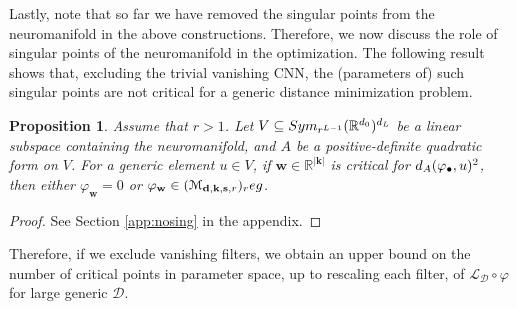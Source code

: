 \documentclass[twoside]{article}
\theoremstyle{plain}%
\newtheorem{prop}[thm]{Proposition}
\theoremstyle{definition}
\theoremstyle{remark}
\newcommand{\symm}[2]{\textnormal{Sym}_{#1}(\mathbb{R}^{#2})}
\newcommand{\edd}{\textnormal{gED}}
\newcommand{\vs}[1]{\textcolor{blue}{{#1}}}
\begin{document}
Lastly, note that so far we have removed the singular points from the neuromanifold in the above constructions. Therefore, we now discuss the role of singular points of the neuromanifold in the optimization. The following result shows that, excluding the trivial vanishing CNN, the (parameters of) such singular points are not critical for a generic distance minimization problem. 

\begin{prop}\label{prop:nosing}
Assume that $r>1$. Let $V \subseteq \symm{r^{L-1}}{d_0}^{d_L}$ be a linear subspace containing the neuromanifold, and $A$ be a positive-definite quadratic form on $V$. For a generic element $u \in V$, if $\mathbf{w}  \in \mathbb{R}^{|\mathbf{k}|}$ is critical for $\textnormal{d}_A(\varphi_{\bullet}, u)^2$, then either $\varphi_\mathbf{w} = 0$ or $\varphi_\mathbf{w} \in (\mathcal{M}_{\mathbf{d}, \mathbf{k}, \mathbf{s}, r})_\textnormal{reg}$.
\end{prop}
\begin{proof}
See Section \ref{app:nosing} in the appendix. 
\end{proof}
Therefore, if we exclude vanishing filters, we obtain an upper bound on the number of critical points in parameter space, up to rescaling each filter, of $\mathcal{L}_{\mathcal{D}} \circ \varphi$ for large generic $\mathcal{D}$. 
\end{document}
